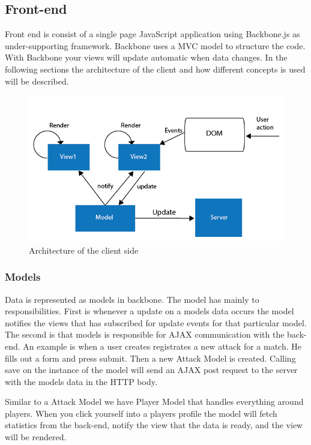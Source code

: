 \subsection{Front-end}

Front end is consist of a single page JavaScript application using Backbone.js \footnotemark as under-supporting framework. Backbone uses a MVC model to structure the code. With Backbone your views will update automatic when data changes. In the following sections the architecture of the client and how different concepts is used will be described. 


\begin{figure}[ht!]
\centering
\includegraphics[width=150mm]{images/architecture/backbone_architecture.png}
\caption{Architecture of the client side}
\label{overflow}
\end{figure}

\subsubsection{Models}

Data is represented as models in backbone. The model has mainly to responsibilities. First is whenever a update on a models data occurs the model notifies the views that has subscribed for update events for that particular model. The second is that models is responsible for AJAX communication  with the back-end. An example is when a user creates registrates a new attack for a match. He fills out a form and press submit. Then a new Attack Model is created. Calling save on the instance of the model will send an AJAX post request to the server with the models data in the HTTP body.

Similar to a Attack Model we have Player Model that handles everything around players. When you click yourself into a players profile the model will fetch statistics from the back-end, notify the view that the data is ready, and the view will be rendered.

